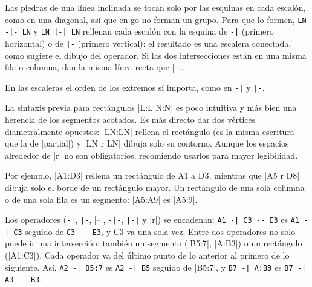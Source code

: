 Las piedras de una línea inclinada se tocan solo por las esquinas en cada escalón, como en una diagonal, así que en go no forman un grupo. Para que lo formen, \verb+LN -|- LN+ y \verb+LN |-| LN+ rellenan cada escalón con la esquina de \verb+-|+ (primero horizontal) o de \verb+|-+ (primero vertical): el resultado es una escalera conectada, como sugiere el dibujo del operador. Si las dos intersecciones están en una misma fila o columna, dan la misma línea recta que |--|.

\begin{codeexample}[width=6cm]
	\begin{goban}[label = {at = all}]
	\end{goban}
\end{codeexample}

En las escaleras el orden de los extremos sí importa, como en \verb+-|+ y \verb+|-+.


La sintaxis previa para rectángulos |L:L N:N| es poco intuitiva y más bien una herencia de los segmentos acotados. Es más directo dar dos vértices diametralmente opuestos: |LN:LN| rellena el rectángulo (es la misma escritura que la de |partial|) y |LN r LN| dibuja solo su contorno. Aunque los espacios alrededor de |r| no son obligatorios, recomiendo usarlos para mayor legibilidad.

\begin{codeexample}[width=6cm]
	\begin{goban}[label = {at = all}]
	\end{goban}
\end{codeexample}

Por ejemplo, |A1:D3| rellena un rectángulo de A1 a D3, mientras que |A5 r D8| dibuja solo el borde de un rectángulo mayor. Un rectángulo de una sola columna o de una sola fila es un segmento: |A5:A9| es |A5:9|.


Los operadores (\verb+-|+, \verb+|-+, |--|, \verb+-|-+, \verb+|-|+ y |r|) se encadenan: \verb+A1 -| C3 -- E3+ es \verb+A1 -| C3+ seguido de \verb+C3 -- E3+, y C3 va una sola vez. Entre dos operadores no solo puede ir una intersección: también un segmento (|B5:7|, |A:B3|) o un rectángulo (|A1:C3|). Cada operador va del último punto de lo anterior al primero de lo siguiente. Así, \verb+A2 -| B5:7+ es \verb+A2 -| B5+ seguido de |B5:7|, y \verb+B7 -| A:B3+ es \verb+B7 -| A3 -- B3+.

